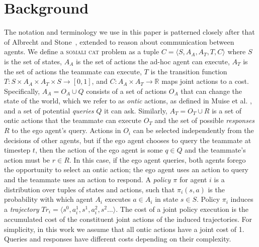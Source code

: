 \documentclass[letterpaper]{article}
\begin{document}
\section{Background}
The notation and terminology we use in this paper is patterned closely after that of Albrecht and Stone~, extended to reason about communication between agents. We define a \textsc{somali cat} problem as a tuple $C=\langle S, A_A, A_T, T, C \rangle$ where $S$ is the set of states, $A_A$ is the set of actions the ad-hoc agent can execute, $A_T$ is the set of actions the teammate can execute, $T$ is the transition function $T:S\times A_A \times A_T \times S \to [0,1]$, and $C: A_A \times A_T \rightarrow \mathbb{R}$ maps joint actions to a cost. Specifically, $A_A = O_A \cup Q$ consists of a set of actions $O_A$ that can change the state of the world, which we refer to as \emph{ontic} actions, as defined in Muise et al. , and a set of potential \emph{queries} $Q$ it can ask. Similarly, $A_T = O_T \cup R$ is a set of ontic actions that the teammate can execute $O_T$ and the set of possible \emph{responses} $R$ to the ego agent's query.
 Actions in $O_i$ can be selected independently from the decisions of other agents, but if the ego agent chooses to query the teammate at timestep $t$, then the action of the ego agent is some $q \in Q$ and the teammate's action must be $r \in R$. In this case, if the ego agent queries, both agents forego the opportunity to select an ontic action; the ego agent uses an action to query and the teammate uses an action to respond.
A \emph{policy $\pi$} for agent $i$ is a distribution over tuples of states and actions, such that $\pi_{i}(s,a)$ is the probability with which agent $A_i$ executes $a \in A_i$ in state $s \in S$.
Policy $\pi_i$ induces a \emph{trajectory} $Tr_i=\langle s^0, a_i^1, s^1, a_i^2, s^2... \rangle$.
The cost of a joint policy execution is the accumulated cost of the constituent joint actions of the induced trajectories.
For simplicity, in this work we assume that all ontic actions have a joint cost of 1. Queries and responses have different costs depending on their complexity.
\end{document}
